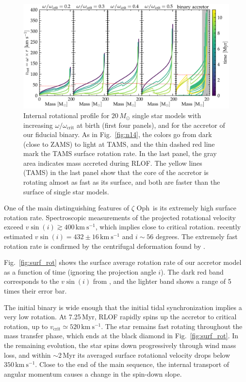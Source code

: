 \documentclass[twocolumn,twocolappendix,trackchanges]{aastex63}
\newcommand{\kms}{{\mathrm{km\ s^{-1}}}}
\DeclareRobustCommand{\Figref}[1]{Fig.~\ref{#1}}
\newcommand{\zoph}{$\zeta$ Oph}
\begin{document}
\begin{figure}[tbp]
  \centering
  \includegraphics[width=\textwidth]{zeta_Rotational_struct}
  \caption{Internal rotational profile for $20\,M_\odot$ single star models with
    increasing $\omega/\omega_\mathrm{crit}$ at birth (first four
    panels), and for the accretor of our fiducial binary. As in
    \Figref{fig:n14}, the colors go from dark (close to ZAMS) to light
    at TAMS, and the thin dashed red line mark the TAMS surface
    rotation rate. In the last panel, the gray area indicates mass
    accreted during RLOF. The yellow lines (TAMS) in the last panel
    show that the core of the accretor is rotating almost as fast as
    its surface, and both are faster than the surface of single star
    models.}
  \label{fig:struct_rot}
\end{figure}

One of the main distinguishing features of \zoph\ is its extremely
high surface rotation rate. Spectroscopic measurements of the
projected rotational velocity exceed $v\sin(i)\gtrsim 400\,\kms$,
which implies close to critical rotation. \cite{zehe:18} recently
estimated $v\sin(i)=432\pm16\,\kms$ and $i\sim56$ degrees. The
extremely fast rotation rate is confirmed by the centrifugal
deformation found by \cite{gordon:18}.

\Figref{fig:surf_rot} shows the surface average rotation rate of our
accretor model as a function of time (ignoring the projection angle
$i$). The dark red band corresponds to the $v\sin(i)$ from
\cite{zehe:18}, and the lighter band shows a range of 5 times their
error bar.

The initial binary is wide enough that the initial tidal
synchronization implies a very low rotation. At 7.25\,Myr, RLOF
rapidly spins up the accretor to critical rotation, up to
$v_\mathrm{crit}\simeq520\,\kms$. The star remains fast rotating
throughout the mass transfer phase, which ends at the black diamond in
\Figref{fig:surf_rot}. In the remaining evolution, the star spins down
progressively through wind mass loss, and within $\sim$2\,Myr its
averaged surface rotational velocity drops below $350\,\kms$. Close to
the end of the main sequence, the internal transport of angular
momentum causes a change in the spin-down slope.
\end{document}
